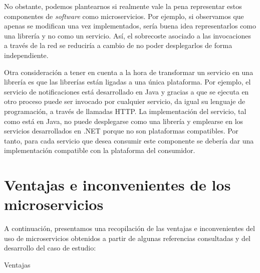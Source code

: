 \documentclass[11pt,spanish,listoffigures]{tfgetsinf}
\begin{document}
No obstante, podemos plantearnos si realmente vale la pena representar estos componentes de \textit{software} como microservicios. Por ejemplo, si observamos que apenas se modifican una vez implementados, sería buena idea representarlos como una librería y no como un servicio. Así, el sobrecoste asociado a las invocaciones a través de la red se reduciría a cambio de no poder desplegarlos de forma independiente.

Otra consideración a tener en cuenta a la hora de transformar un servicio en una librería es que las librerías están ligadas a una única plataforma. Por ejemplo, el servicio de notificaciones está desarrollado en Java y gracias a que se ejecuta en otro proceso puede ser invocado por cualquier servicio, da igual su lenguaje de programación, a través de llamadas HTTP. La implementación del servicio, tal como está en Java, no puede desplegarse como una librería y emplearse en los servicios desarrollados en .NET porque no son plataformas compatibles. Por tanto, para cada servicio que desea consumir este componente se debería dar una implementación compatible con la plataforma del consumidor.

\section{Ventajas e inconvenientes de los microservicios} \label{sect:Comparativa}

A continuación, presentamos una recopilación de las ventajas e inconvenientes del uso de microservicios obtenidos a partir de algunas referencias consultadas y del desarrollo del caso de estudio:

{\Huge Ventajas}
\end{document}
